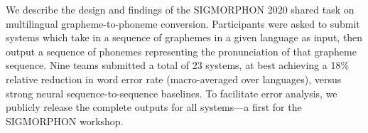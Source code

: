 We describe the design and findings of the SIGMORPHON 2020 shared task on multilingual grapheme-to-phoneme conversion. Participants were asked to submit systems which take in a sequence of graphemes in a given language as input, then output a sequence of phonemes representing the pronunciation of that grapheme sequence. Nine teams submitted a total of 23 systems, at best achieving a 18\% relative reduction in word error rate (macro-averaged over languages), versus strong neural sequence-to-sequence baselines. To facilitate error analysis, we publicly release the complete outputs for all systems---a first for the SIGMORPHON workshop.
